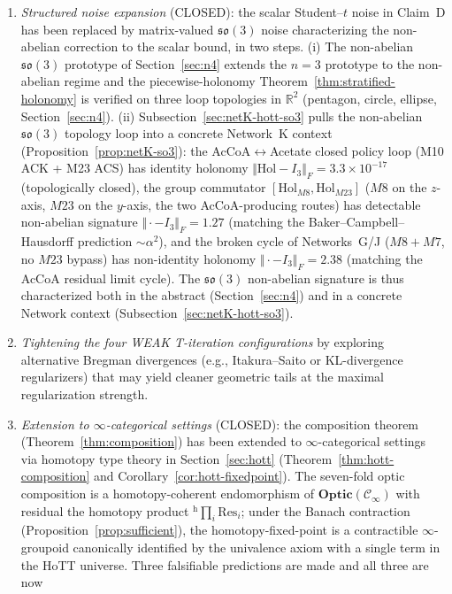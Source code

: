 \documentclass[11pt,a4paper]{article}
\theoremstyle{plain}
\theoremstyle{definition}
\theoremstyle{remark}
\newcommand{\RR}{\mathbb{R}}
\newcommand{\so}{\mathfrak{so}}
\newcommand{\Optic}{\mathbf{Optic}}
\newcommand{\normF}[1]{\mathopen{}\Vert#1\mathclose{}\Vert_{\!F}}
\begin{document}
\begin{enumerate}[leftmargin=*,itemsep=2pt]
\item \emph{Structured noise expansion} (CLOSED): the scalar Student--$t$
noise in Claim~D has been replaced by matrix-valued $\so(3)$ noise
characterizing the non-abelian correction to the scalar bound, in two
steps. (i) The non-abelian $\so(3)$ prototype of Section~\ref{sec:n4}
extends the $n=3$ prototype to the non-abelian regime and the
piecewise-holonomy Theorem~\ref{thm:stratified-holonomy} is verified
on three loop topologies in $\RR^2$ (pentagon, circle, ellipse,
Section~\ref{sec:n4}). (ii) Subsection~\ref{sec:netK-hott-so3} pulls
the non-abelian $\so(3)$ topology loop into a concrete Network~K
context (Proposition~\ref{prop:netK-so3}): the AcCoA$\leftrightarrow$Acetate
closed policy loop (M10 ACK + M23 ACS) has identity holonomy
$\normF{\mathrm{Hol} - I_3} = 3.3 \times 10^{-17}$ (topologically closed),
the group commutator $[\mathrm{Hol}_{M8}, \mathrm{Hol}_{M23}]$
($M8$ on the $z$-axis, $M23$ on the $y$-axis, the two AcCoA-producing
routes) has detectable non-abelian signature
$\normF{\cdot - I_3} = 1.27$ (matching the Baker--Campbell--Hausdorff
prediction $\sim \alpha^2$), and the broken cycle of Networks~G/J
($M8 + M7$, no $M23$ bypass) has non-identity holonomy
$\normF{\cdot - I_3} = 2.38$ (matching the AcCoA residual limit cycle).
The $\so(3)$ non-abelian signature is thus characterized both in the
abstract (Section~\ref{sec:n4}) and in a concrete Network context
(Subsection~\ref{sec:netK-hott-so3}).
\item \emph{Tightening the four WEAK T-iteration configurations} by
exploring alternative Bregman divergences (e.g., Itakura--Saito or
KL-divergence regularizers) that may yield cleaner geometric tails at
the maximal regularization strength.
\item \emph{Extension to $\infty$-categorical settings} (CLOSED): the
composition theorem (Theorem~\ref{thm:composition}) has been extended
to $\infty$-categorical settings via homotopy type theory in
Section~\ref{sec:hott} (Theorem~\ref{thm:hott-composition} and
Corollary~\ref{cor:hott-fixedpoint}). The seven-fold optic composition
is a homotopy-coherent endomorphism of $\Optic(\mathcal{C}_\infty)$
with residual the homotopy product ${}^{\mathrm{h}}\!\prod_i \mathrm{Res}_i$; under
the Banach contraction (Proposition~\ref{prop:sufficient}), the
homotopy-fixed-point is a contractible $\infty$-groupoid canonically
identified by the univalence axiom with a single term in the HoTT
universe. Three falsifiable predictions are made and all three are now

\end{enumerate}
\end{document}
